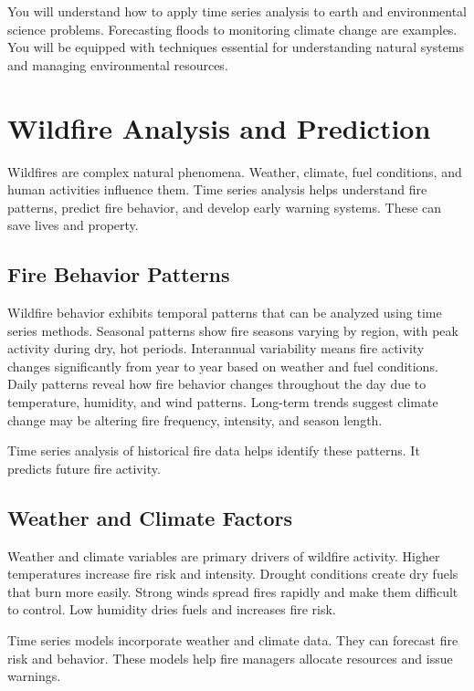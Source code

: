 You will understand how to apply time series analysis to earth and environmental science problems. Forecasting floods to monitoring climate change are examples. You will be equipped with techniques essential for understanding natural systems and managing environmental resources.

\section{Wildfire Analysis and Prediction}

Wildfires are complex natural phenomena. Weather, climate, fuel conditions, and human activities influence them. Time series analysis helps understand fire patterns, predict fire behavior, and develop early warning systems. These can save lives and property.

\subsection{Fire Behavior Patterns}

Wildfire behavior exhibits temporal patterns that can be analyzed using time series methods. Seasonal patterns show fire seasons varying by region, with peak activity during dry, hot periods. Interannual variability means fire activity changes significantly from year to year based on weather and fuel conditions. Daily patterns reveal how fire behavior changes throughout the day due to temperature, humidity, and wind patterns. Long-term trends suggest climate change may be altering fire frequency, intensity, and season length.

Time series analysis of historical fire data helps identify these patterns. It predicts future fire activity.

\subsection{Weather and Climate Factors}

Weather and climate variables are primary drivers of wildfire activity. Higher temperatures increase fire risk and intensity. Drought conditions create dry fuels that burn more easily. Strong winds spread fires rapidly and make them difficult to control. Low humidity dries fuels and increases fire risk.

Time series models incorporate weather and climate data. They can forecast fire risk and behavior. These models help fire managers allocate resources and issue warnings.

